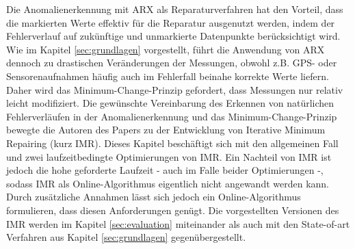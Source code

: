 Die Anomalienerkennung mit ARX als Reparaturverfahren hat den Vorteil, dass die
markierten Werte effektiv für die Reparatur ausgenutzt werden, indem der
Fehlerverlauf auf zukünftige und unmarkierte Datenpunkte berücksichtigt wird.
Wie im Kapitel \ref{sec:grundlagen} vorgestellt, führt die Anwendung von
ARX dennoch zu drastischen Veränderungen der Messungen, obwohl z.B. GPS- oder
Sensorenaufnahmen häufig auch im Fehlerfall beinahe korrekte Werte liefern.
Daher wird das Minimum-Change-Prinzip gefordert, dass Messungen nur relativ
leicht modifiziert.  Die gewünschte Vereinbarung des Erkennen von natürlichen
Fehlerverläufen in der Anomalienerkennung und das  Minimum-Change-Prinzip
bewegte die Autoren des Papers zu der Entwicklung von Iterative Minimum
Repairing (kurz IMR).  Dieses Kapitel beschäftigt sich mit den
allgemeinen Fall und zwei laufzeitbedingte Optimierungen von IMR. Ein Nachteil
von IMR ist jedoch die hohe geforderte Laufzeit - auch im Falle beider
Optimierungen -, sodass IMR als Online-Algorithmus eigentlich nicht angewandt
werden kann. Durch zusätzliche Annahmen lässt sich jedoch ein
Online-Algorithmus formulieren, dass diesen Anforderungen genügt. Die
vorgestellten Versionen des IMR werden im Kapitel \ref{sec:evaluation}
miteinander als auch mit den State-of-art Verfahren aus Kapitel
\ref{sec:grundlagen} gegenübergestellt.

